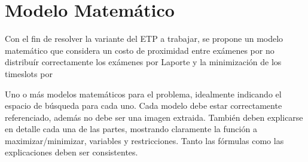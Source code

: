 \documentclass[letter, 10pt]{article}
\begin{document}
\begin{table}[]
\centering
{}
\caption{Principales restricciones blandas en ETP \cite{Qu2009}}
\label{tab:blandas}
\end{table}


\section{Modelo Matem\'atico}

Con el fin de resolver la variante del ETP a trabajar, se propone un modelo matemático que considera un costo de proximidad entre exámenes \cite{LAPORTE1984351} por no distribuír correctamente los exámenes por Laporte y la minimización de los timeslots por \cite{WIJGERS}

Uno o m\'as modelos matem\'aticos para el problema, idealmente indicando el espacio de b\'usqueda para cada uno. Cada modelo debe estar correctamente referenciado, adem\'as no debe ser una imagen extraida. Tambi\'en deben explicarse en detalle cada una de las partes, mostrando claramente la funci\'on a maximizar/minimizar, variables y restricciones. Tanto las f\'ormulas como las explicaciones deben ser consistentes.\\
\end{document}

